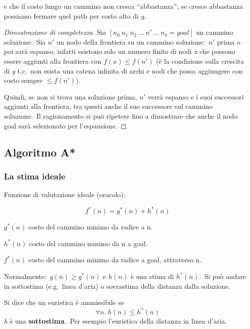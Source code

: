 \noindent e che il costo lungo un cammino non cresca ``abbastanza''; se cresce abbastanza possiamo fermare quel path per costo alto di \textit{g}.

\begin{proof}[Dimostrazione di completezza]

	Sia $[n_0\ n_1\ n_2\ \dots\ n'\ \dots\ n_k = goal]$ un cammino soluzione.\
	Sia $n'$ un nodo della frontiera su un cammino soluzione:\ $n'$ prima o poi sarà espanso, infatti esistono solo un numero finito di nodi \textit{x} che possono essere aggiunti alla frontiera con $f(x) \leq f(n')$ (è la condizione sulla crescita di \textit{g} t.c.\ non esista una catena infinita di archi e nodi che possa aggiungere con costo sempre $\leq f(n')$).

	Quindi, se non si trova una soluzione prima, $n'$ verrà espanso e i suoi successori aggiunti alla frontiera, tra questi anche il suo successore sul cammino soluzione.\
	Il ragionamento si può ripetere fino a dimostrare che anche il nodo goal sarà selezionato per l'espansione.

\end{proof}

\subsection{Algoritmo A*}

\subsubsection{La stima ideale}
\begin{flushleft}
	Funzione di valutazione ideale (oracolo):

	\[f^*(n) = g^*(n) + h^*(n)\]

	$g^*(n)$ costo del cammino minimo da radice a n.

	$h^*(n)$ costo del cammino minimo da n a goal.

	$f^*(n)$ costo del cammino minimo da radice a goal, attraverso n.
\end{flushleft}

\noindent Normalmente:\ $g(n) \geq g^*(n)$ e $h(n)$ è una stima di $h^*(n)$.\
Si può andare in sottostima (e.g.\ linea d'aria) o sovrastima della distanza dalla soluzione.

\begin{definition}
	Si dice che un euristica è ammissibile se
	\[
		\forall n.\ h(n) \leq h^*(n)
	\]
	\textit{h} è una \textbf{sottostima}.\
	Per esempio l'euristica della distanza in linea d'aria.

\end{definition}

